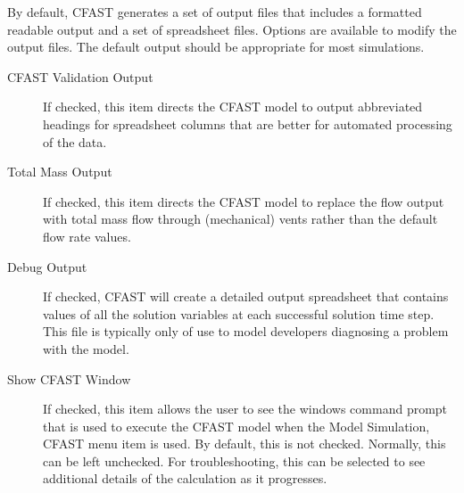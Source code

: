 By default, CFAST generates a set of output files that includes a formatted readable output and a set of spreadsheet files.  Options are available to modify the output files.  The default output should be appropriate for most simulations.

\begin{description}
    \item[CFAST Validation Output] If checked, this item directs the CFAST model to output abbreviated headings for spreadsheet columns that are better for automated processing of the data.
    \item[Total Mass Output] If checked, this item directs the CFAST model to replace the flow output with total mass flow through (mechanical) vents rather than the default flow rate values.
    \item[Debug Output] If checked, CFAST will create a detailed output spreadsheet that contains values of all the solution variables at each successful solution time step. This file is typically only of use to model developers diagnosing a problem with the model.
    \item[Show CFAST Window] If checked, this item allows the user to see the windows command prompt that is used to execute the CFAST model when the Model Simulation, CFAST menu item is used.  By default, this is not checked.  Normally, this can be left unchecked.  For troubleshooting, this can be selected to see additional details of the calculation as it progresses.
\end{description}




